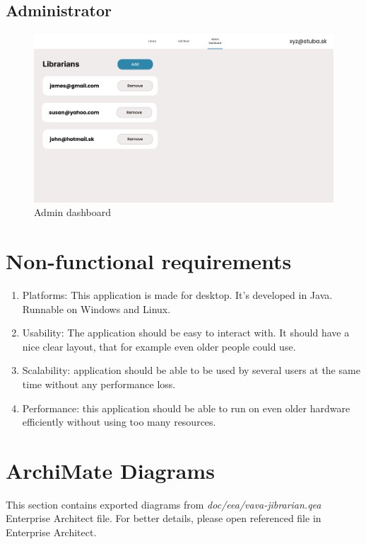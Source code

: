 \documentclass[11pt,twoside,a4paper]{article}
\begin{document}
\pagebreak
\subsection*{Administrator}

\begin{figure}[!ht]
    \includegraphics[scale=.2]{../mockups/Admin-dashboard.png}
    \centering
    \caption{Admin dashboard}
\end{figure}

\section{Non-functional requirements}

\begin{enumerate}
    \item Platforms: This application is made for desktop. It's developed in Java. Runnable on Windows and Linux.
    \item Usability: The application should be easy to interact with. It should have a nice clear layout, that for example even older people could use.
    \item Scalability: application should be able to be used by several users at the same time without any performance loss.
    \item Performance: this application should be able to run on even older hardware efficiently without using too many resources.
\end{enumerate}

\section{ArchiMate Diagrams}

This section contains exported diagrams from \emph{doc/eea/vava-jibrarian.qea}
Enterprise Architect file. For better details, please open referenced file
in Enterprise Architect.
\end{document}
